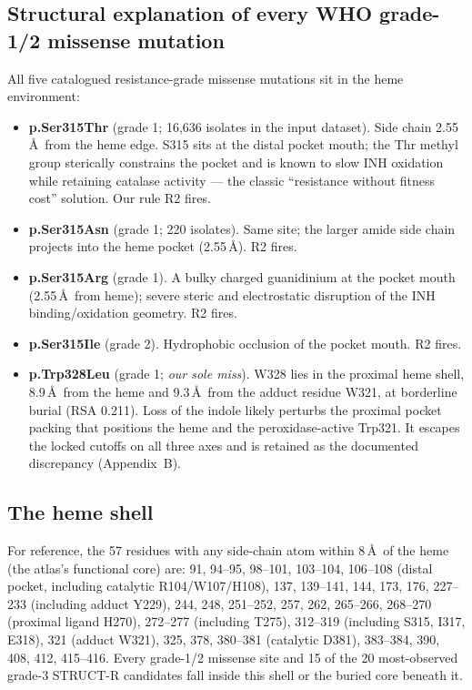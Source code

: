 \documentclass[11pt]{article}
\begin{document}
\subsection{Structural explanation of every WHO grade-1/2 missense mutation}
\label{sec:permut}
All five catalogued resistance-grade missense mutations sit in the heme environment:
\begin{itemize}
\item \textbf{p.Ser315Thr} (grade 1; 16,636 isolates in the input dataset). Side chain 2.55\,\AA\ from the heme edge. S315 sits at the distal pocket mouth; the Thr methyl group sterically constrains the pocket and is known to slow INH oxidation while retaining catalase activity --- the classic ``resistance without fitness cost'' solution. Our rule R2 fires.
\item \textbf{p.Ser315Asn} (grade 1; 220 isolates). Same site; the larger amide side chain projects into the heme pocket (2.55\,\AA). R2 fires.
\item \textbf{p.Ser315Arg} (grade 1). A bulky charged guanidinium at the pocket mouth (2.55\,\AA\ from heme); severe steric and electrostatic disruption of the INH binding/oxidation geometry. R2 fires.
\item \textbf{p.Ser315Ile} (grade 2). Hydrophobic occlusion of the pocket mouth. R2 fires.
\item \textbf{p.Trp328Leu} (grade 1; \emph{our sole miss}). W328 lies in the proximal heme shell, 8.9\,\AA\ from the heme and 9.3\,\AA\ from the adduct residue W321, at borderline burial (RSA 0.211). Loss of the indole likely perturbs the proximal pocket packing that positions the heme and the peroxidase-active Trp321. It escapes the locked cutoffs on all three axes and is retained as the documented discrepancy (Appendix~B).
\end{itemize}

\subsection{The heme shell}
For reference, the 57 residues with any side-chain atom within 8\,\AA\ of the heme (the atlas's functional core) are: 91, 94--95, 98--101, 103--104, 106--108 (distal pocket, including catalytic R104/W107/H108), 137, 139--141, 144, 173, 176, 227--233 (including adduct Y229), 244, 248, 251--252, 257, 262, 265--266, 268--270 (proximal ligand H270), 272--277 (including T275), 312--319 (including S315, I317, E318), 321 (adduct W321), 325, 378, 380--381 (catalytic D381), 383--384, 390, 408, 412, 415--416. Every grade-1/2 missense site and 15 of the 20 most-observed grade-3 STRUCT-R candidates fall inside this shell or the buried core beneath it.
\end{document}
